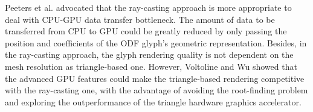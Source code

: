 \documentclass[twoside,twocolumn,10pt]{article}
\begin{document}
Peeters et al. \cite{peeters2009} advocated that the ray-casting approach is more appropriate to deal with CPU-GPU data transfer bottleneck. The amount of data to be transferred from CPU to GPU could be greatly reduced by only passing the position and coefficients of the ODF glyph's geometric representation. Besides, in the ray-casting approach, the glyph rendering quality is not dependent on the mesh resolution as triangle-based one. However, Voltoline and Wu showed that the advanced GPU features could make the triangle-based rendering competitive with the ray-casting one, with the advantage of avoiding the root-finding problem and exploring the outperformance of the triangle hardware graphics accelerator.




\end{document}
